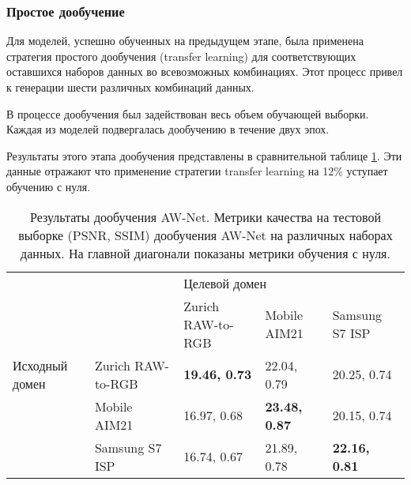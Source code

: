 \subsubsection{Простое дообучение}

Для моделей, успешно обученных на предыдущем этапе, была применена стратегия простого дообучения (transfer learning) для соответствующих оставшихся наборов данных во всевозможных комбинациях. Этот процесс привел к генерации шести различных комбинаций данных.

В процессе дообучения был задействован весь объем обучающей выборки. Каждая из моделей подвергалась дообучению в течение двух эпох.

Результаты этого этапа дообучения представлены в сравнительной таблице \ref{tab:tl}. Эти данные отражают что применение стратегии transfer learning на 12\% уступает обучению с нуля.

\begin{table}[H]
    \caption{Результаты дообучения AW-Net. Метрики качества на тестовой выборке (PSNR, SSIM) дообучения AW-Net на различных наборах данных. На главной диагонали показаны метрики обучения с нуля.}\label{tab:tl}
    \begin{tabular}{|p{3cm}p{3cm}|p{3cm}p{3cm}p{3cm}|}
        \hline
        \multicolumn{2}{|p{3cm}|}{\multirow{2}{*}{}}                     & \multicolumn{3}{p{5cm}|}{Целевой домен}                                                                                \\ \cline{3-5} 
        \multicolumn{2}{|p{3cm}|}{}                                      & \multicolumn{1}{p{3cm}|}{Zurich RAW-to-RGB}    & \multicolumn{1}{p{3cm}|}{Mobile AIM21}         & Samsung S7 ISP       \\ \hline
        \multicolumn{1}{|p{3cm}|}{Исходный домен}    & Zurich RAW-to-RGB & \multicolumn{1}{p{3cm}|}{\textbf{19.46, 0.73}} & \multicolumn{1}{p{3cm}|}{22.04, 0.79}          & 20.25, 0.74          \\ \cline{2-5} 
        \multicolumn{1}{|p{3cm}|}{}                  & Mobile AIM21      & \multicolumn{1}{p{3cm}|}{16.97, 0.68}          & \multicolumn{1}{p{3cm}|}{\textbf{23.48, 0.87}} & 20.15, 0.74          \\ \cline{2-5} 
        \multicolumn{1}{|p{3cm}|}{}                  & Samsung S7 ISP    & \multicolumn{1}{p{3cm}|}{16.74, 0.67}          & \multicolumn{1}{p{3cm}|}{21.89, 0.78}          & \textbf{22.16, 0.81} \\ \hline
    \end{tabular}
\end{table}

